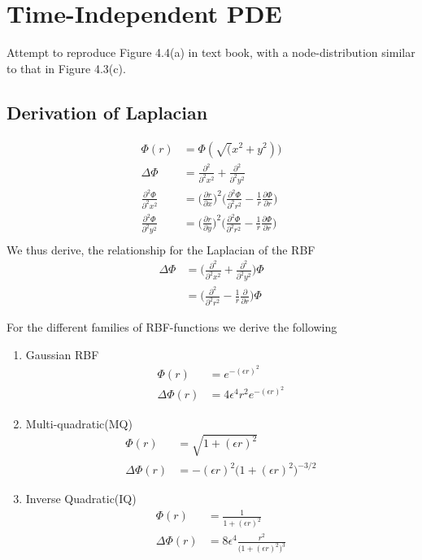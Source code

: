 \documentclass[11pt]{article}
\begin{document}


\section{Time-Independent PDE}
Attempt to reproduce Figure 4.4(a) in text book, with a node-distribution similar to that in Figure 4.3(c).

\subsection{Derivation of Laplacian}

\begin{align*}
\Phi(r) &= \Phi(\sqrt(x^2 + y^2))\\
\Delta\Phi &= \frac{\partial^2}{\partial^2 x^2 } + \frac{\partial^2}{\partial^2 y^2}\\
\frac{\partial^2 \Phi}{\partial^2 x^2 } & = \big(\frac{\partial r}{\partial x }\big)^2 \big( \frac{\partial^2 \Phi}{\partial^2 r^2} - \frac{1}{r} \frac{\partial \Phi}{\partial r} \big)\\
\frac{\partial^2 \Phi}{\partial^2 y^2 } & = \big(\frac{\partial r}{\partial y }\big)^2 \big( \frac{\partial^2 \Phi}{\partial^2 r^2} - \frac{1}{r} \frac{\partial \Phi}{\partial r} \big)\\
\end{align*}
We thus derive, the relationship for the Laplacian of the RBF
\begin{align}
\Delta\Phi &= \big( \frac{\partial^2}{\partial^2 x^2 } + \frac{\partial^2}{\partial^2 y^2} \big) \Phi\\
&= \big( \frac{\partial^2 }{\partial^2 r^2} - \frac{1}{r} \frac{\partial }{\partial r} \big)\Phi
\end{align}

For the different families of RBF-functions we derive the following
\begin{enumerate}
\item Gaussian RBF
\begin{align}
\Phi(r) &= e^{-(\epsilon r)^2}\\
\Delta\Phi(r) &= 4\epsilon^4 r^2 e^{-(\epsilon r)^2}
\end{align}

\item Multi-quadratic(MQ)
\begin{align}
\Phi(r) &= \sqrt{1 + (\epsilon r)^2}\\
\Delta \Phi(r) &= - (\epsilon r)^2 \big( 1 + (\epsilon r)^2\big)^{-3/2}
\end{align}

\item Inverse Quadratic(IQ)
\begin{align}
\Phi(r) &= \frac{1}{1 + (\epsilon r)^2}\\
\Delta\Phi(r) &= 8\epsilon^4 \frac{r^2}{\big(1 + (\epsilon r)^2\big)^3}
\end{align}



\end{enumerate}
\end{document}
